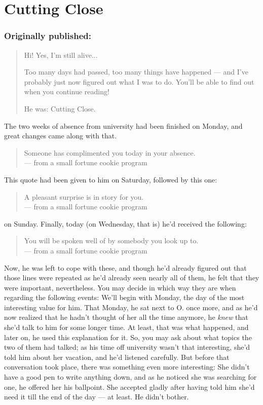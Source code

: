 \chapter{Cutting Close}
\label{cha:cutting-close}
\subsection*{Originally published: }
\begin{quote}
Hi! Yes, I'm still alive...

Too many days had passed, too many things have happened --- and I've probably just now figured out what I was to do. You'll be able to find out when you continue reading!

He was: Cutting Close.
\end{quote}

The two weeks of absence from university had been finished on Monday, and great changes came along with that. 
\begin{verse}
Someone has complimented you today in your absence. \\
--- from a small fortune cookie program
\end{verse}
This quote had been given to him on Saturday, followed by this one: 
\begin{verse}
A pleasant surprise is in story for you. \\
--- from a small fortune cookie program
\end{verse}
on Sunday. Finally, today (on Wednesday, that is) he'd received the following: 
\begin{verse}
You will be spoken well of by somebody you look up to. \\
--- from a small fortune cookie program
\end{verse}
Now, he was left to cope with these, and though he'd already figured out that those lines were repeated as he'd already seen nearly all of them, he felt that they were important, nevertheless. You may decide in which way they are when regarding the following events: 
We'll begin with Monday, the day of the most interesting value for him. That Monday, he sat next to O. once more, and as he'd now realized that he hadn't thought of her all the time anymore, he \emph{knew} that she'd talk to him for some longer time. At least, that was what happened, and later on, he used this explanation for it. So, you may ask about what topics the two of them had talked; as his time off university wasn't that interesting, she'd told him about her vacation, and he'd listened carefully. But before that conversation took place, there was something even more interesting: She didn't have a good pen to write anything down, and as he noticed she was searching for one, he offered her his ballpoint. She accepted gladly after having told him she'd need it till the end of the day --- at least. 
He didn't bother.

